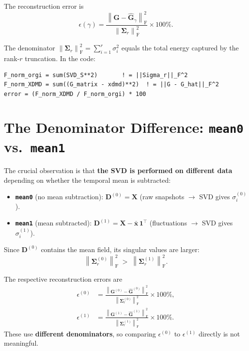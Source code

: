 \documentclass[11pt,a4paper]{article}
\newcommand{\norm}[1]{\left\lVert #1 \right\rVert}
\newcommand{\Fro}{\mathrm{F}}
\newcommand{\Sigmat}{\bm{\Sigma}}
\begin{document}
The reconstruction error is
\begin{equation}\label{eq:eps}
\boxed{\epsilon(\gamma) = \frac{\norm{\bm{G} - \hat{\bm{G}}_\gamma}_\Fro^2}{\norm{\Sigmat_r}_\Fro^2} \times 100\%.}
\end{equation}

The denominator $\norm{\Sigmat_r}_\Fro^2 = \sum_{i=1}^{r}\sigma_i^2$ equals the total energy captured by the rank-$r$ truncation.  In the code:
\begin{verbatim}
F_norm_orgi = sum(SVD_S**2)       ! = ||Sigma_r||_F^2
F_norm_XDMD = sum((G_matrix - xdmd)**2)  ! = ||G - G_hat||_F^2
error = (F_norm_XDMD / F_norm_orgi) * 100
\end{verbatim}


\section{The Denominator Difference: \texttt{mean0} vs.\ \texttt{mean1}}
\label{sec:denom}

The crucial observation is that \textbf{the SVD is performed on different data} depending on whether the temporal mean is subtracted:

\begin{itemize}
\item \textbf{\texttt{mean0}} (no mean subtraction): $\bm{D}^{(0)} = \bm{X}$ (raw snapshots $\to$ SVD gives $\sigma_i^{(0)}$).
\item \textbf{\texttt{mean1}} (mean subtracted): $\bm{D}^{(1)} = \bm{X} - \bar{\bm{x}}\,\bm{1}^\top$ (fluctuations $\to$ SVD gives $\sigma_i^{(1)}$).
\end{itemize}

Since $\bm{D}^{(0)}$ contains the mean field, its singular values are larger:
\begin{equation}
\norm{\Sigmat_r^{(0)}}_\Fro^2 \;>\; \norm{\Sigmat_r^{(1)}}_\Fro^2.
\end{equation}

The respective reconstruction errors are
\begin{align}
\epsilon^{(0)} &= \frac{\norm{\bm{G}^{(0)} - \hat{\bm{G}}^{(0)}}_\Fro^2}{\norm{\Sigmat_r^{(0)}}_\Fro^2} \times 100\%,\label{eq:eps0}\\[6pt]
\epsilon^{(1)} &= \frac{\norm{\bm{G}^{(1)} - \hat{\bm{G}}^{(1)}}_\Fro^2}{\norm{\Sigmat_r^{(1)}}_\Fro^2} \times 100\%.\label{eq:eps1}
\end{align}
These use \textbf{different denominators}, so comparing $\epsilon^{(0)}$ to $\epsilon^{(1)}$ directly is not meaningful.
\end{document}
